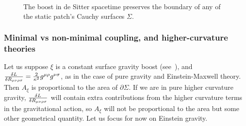 \documentclass[]{jkpaper}
\theoremstyle{plain}
\theoremstyle{definition}
\begin{document}
\begin{figure}
    \centering
    \caption{The boost in de Sitter spacetime preserves the boundary of any of the static patch's Cauchy surfaces $\Sigma$.}
    \label{Figure: static patch boost}
\end{figure}


\subsubsection{Minimal vs non-minimal coupling, and higher-curvature theories}

Let us suppose $\xi$ is a constant surface gravity boost (see~\cite{Jensen:2023yxy}), and $\fdv{L}{R_{\mu\nu\rho\sigma}}=\frac2{\kappa^2}g^{\mu\rho}g^{\nu\sigma}$, as in the case of pure gravity and Einstein-Maxwell theory. Then $A_\xi$ is proportional to the area of $\partial\Sigma$. If we are in pure higher curvature gravity, $\fdv{L}{R_{\mu\nu\rho\sigma}}$ will contain extra contributions from the higher curvature terms in the gravitational action, so $A_\xi$ will not be proportional to the area but some other geometrical quantity. Let us focus for now on Einstein gravity.
\end{document}
